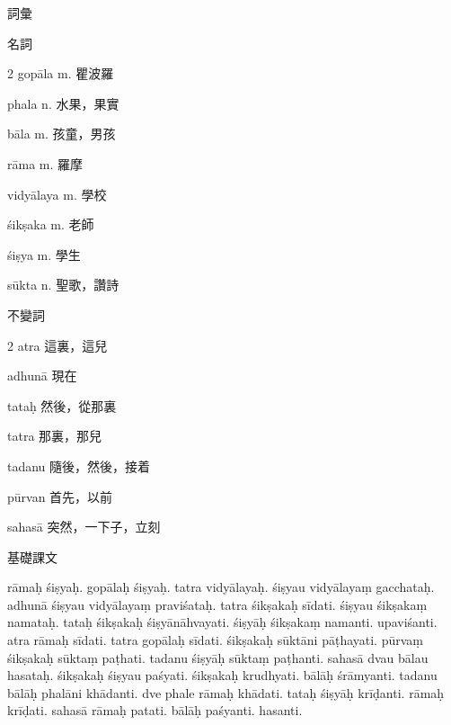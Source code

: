 \documentclass[aspectratio=169]{beamer}
\begin{document}
\begin{frame}{詞彙}
    \begin{block}{名詞}
        \begin{VocabCols}{2}
             gopāla m. 瞿波羅
            
             phala n. 水果，果實
            
             bāla m. 孩童，男孩

             rāma m. 羅摩

             vidyālaya m. 學校

             śikṣaka m. 老師

             śiṣya m. 學生

             sūkta n. 聖歌，讚詩
        \end{VocabCols}
    \end{block}

    \begin{block}{不變詞}
        \begin{VocabCols}{2}
             atra 這裏，這兒

             adhunā 現在

             tataḥ 然後，從那裏

             tatra 那裏，那兒

             tadanu 隨後，然後，接着

             pūrvan 首先，以前

             sahasā 突然，一下子，立刻
        \end{VocabCols}
    \end{block}
\end{frame}

\begin{frame}{基礎課文}

    rāmaḥ śiṣyaḥ. gopālaḥ śiṣyaḥ. tatra vidyālayaḥ. śiṣyau vidyālayaṃ gacchataḥ. adhunā śiṣyau vidyālayaṃ praviśataḥ. tatra śikṣakaḥ sīdati. śiṣyau śikṣakaṃ namataḥ. tataḥ śikṣakaḥ śiṣyānāhvayati. śiṣyāḥ śikṣakaṃ namanti. upaviśanti. atra rāmaḥ sīdati. tatra gopālaḥ sīdati. śikṣakaḥ sūktāni pāṭhayati. pūrvaṃ śikṣakaḥ sūktaṃ paṭhati. tadanu śiṣyāḥ sūktaṃ paṭhanti. sahasā dvau bālau hasataḥ. śikṣakaḥ śiṣyau paśyati. śikṣakaḥ krudhyati. bālāḥ śrāmyanti. tadanu bālāḥ phalāni khādanti. dve phale rāmaḥ khādati. tataḥ śiṣyāḥ krīḍanti. rāmaḥ krīḍati. sahasā rāmaḥ patati. bālāḥ paśyanti. hasanti.
\end{frame}
\end{document}
